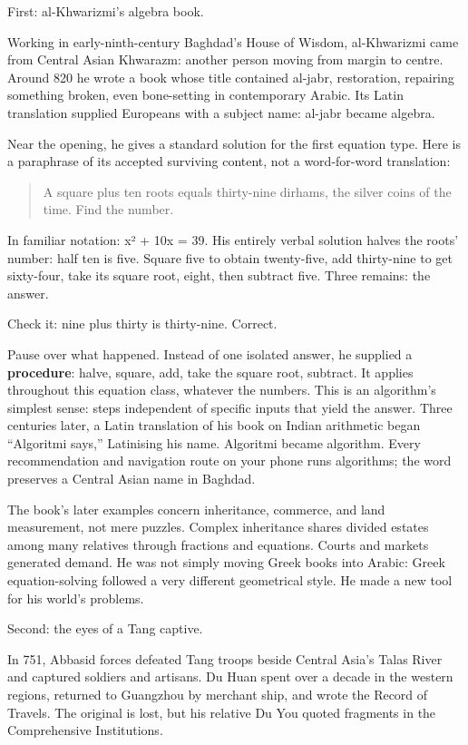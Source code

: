 First: al-Khwarizmi's algebra book.

Working in early-ninth-century Baghdad's House of Wisdom, al-Khwarizmi came from Central Asian Khwarazm: another person moving from margin to centre. Around 820 he wrote a book whose title contained al-jabr, restoration, repairing something broken, even bone-setting in contemporary Arabic. Its Latin translation supplied Europeans with a subject name: al-jabr became algebra.

Near the opening, he gives a standard solution for the first equation type. Here is a paraphrase of its accepted surviving content, not a word-for-word translation:

\begin{quote}
A square plus ten roots equals thirty-nine dirhams, the silver coins of the time. Find the number.
\end{quote}
In familiar notation: x² + 10x = 39. His entirely verbal solution halves the roots' number: half ten is five. Square five to obtain twenty-five, add thirty-nine to get sixty-four, take its square root, eight, then subtract five. Three remains: the answer.

Check it: nine plus thirty is thirty-nine. Correct.

Pause over what happened. Instead of one isolated answer, he supplied a \textbf{procedure}: halve, square, add, take the square root, subtract. It applies throughout this equation class, whatever the numbers. This is an algorithm's simplest sense: steps independent of specific inputs that yield the answer. Three centuries later, a Latin translation of his book on Indian arithmetic began ``Algoritmi says,'' Latinising his name. Algoritmi became algorithm. Every recommendation and navigation route on your phone runs algorithms; the word preserves a Central Asian name in Baghdad.

The book's later examples concern inheritance, commerce, and land measurement, not mere puzzles. Complex inheritance shares divided estates among many relatives through fractions and equations. Courts and markets generated demand. He was not simply moving Greek books into Arabic: Greek equation-solving followed a very different geometrical style. He made a new tool for his world's problems.

Second: the eyes of a Tang captive.

In 751, Abbasid forces defeated Tang troops beside Central Asia's Talas River and captured soldiers and artisans. Du Huan spent over a decade in the western regions, returned to Guangzhou by merchant ship, and wrote the Record of Travels. The original is lost, but his relative Du You quoted fragments in the Comprehensive Institutions.

